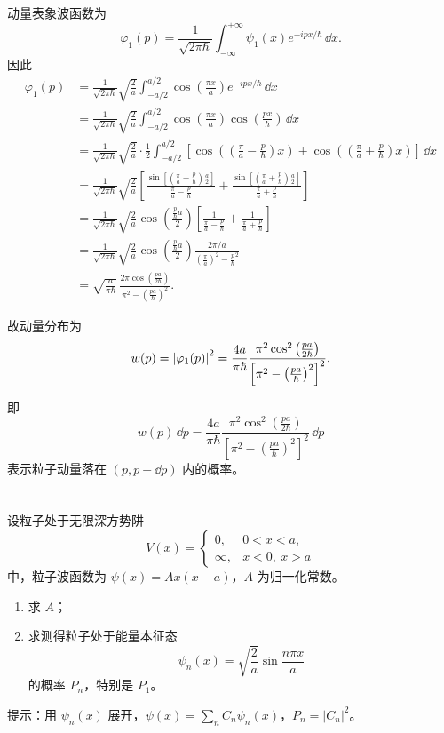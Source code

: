 \documentclass[10pt,a4paper]{article}
\begin{document}
动量表象波函数为
\[
\varphi_1(p)=\frac{1}{\sqrt{2\pi\hbar}}\int_{-\infty}^{+\infty}\psi_1(x)e^{-ipx/\hbar}\, \dd x.
\]
因此
\begin{align*}
  \varphi_1(p)&=\frac{1}{\sqrt{2\pi\hbar}}\sqrt{\frac{2}{a}}\int_{-a/2}^{a/2}\cos\left(\frac{\pi x}{a}\right)e^{-ipx/\hbar}\, \dd x\\
  &=\frac{1}{\sqrt{2\pi\hbar}}\sqrt{\frac{2}{a}}\int_{-a/2}^{a/2}\cos\left(\frac{\pi x}{a}\right)\cos\left(\frac{px}{\hbar}\right)\, \dd x\\
  &=\frac{1}{\sqrt{2\pi\hbar}}\sqrt{\frac{2}{a}}\cdot\frac{1}{2}
  \int_{-a/2}^{a/2}
  \left[
  \cos\left(\left(\frac{\pi}{a}-\frac{p}{\hbar}\right)x\right)
  +\cos\left(\left(\frac{\pi}{a}+\frac{p}{\hbar}\right)x\right)
  \right]\, \dd x \\
  &=\frac{1}{\sqrt{2\pi\hbar}}\sqrt{\frac{2}{a}}
  \left[
  \frac{\sin\left[\left(\frac{\pi}{a}-\frac{p}{\hbar}\right)\frac{a}{2}\right]}{\frac{\pi}{a}-\frac{p}{\hbar}}
  +
  \frac{\sin\left[\left(\frac{\pi}{a}+\frac{p}{\hbar}\right)\frac{a}{2}\right]}{\frac{\pi}{a}+\frac{p}{\hbar}}
  \right] \\
  &=\frac{1}{\sqrt{2\pi\hbar}}\sqrt{\frac{2}{a}}
  \cos\left(\frac{\frac{p}{\hbar}a}{2}\right)
  \left[
  \frac{1}{\frac{\pi}{a}-\frac{p}{\hbar}}
  +
  \frac{1}{\frac{\pi}{a}+\frac{p}{\hbar}}
  \right] \\
  &=\frac{1}{\sqrt{2\pi\hbar}}\sqrt{\frac{2}{a}}
  \cos\left(\frac{\frac{p}{\hbar}a}{2}\right)
  \frac{2\pi/a}{\left(\frac{\pi}{a}\right)^2-\frac{p}{\hbar}^2} \\
  &=\sqrt{\frac{a}{\pi\hbar}}\,
  \frac{2\pi\cos\left(\frac{pa}{2\hbar}\right)}{\pi^2-\left(\frac{pa}{\hbar}\right)^2}.
\end{align*}

故动量分布为
\[
w(p)=\abs{\varphi_1(p)}^2
=\frac{4a}{\pi\hbar}
\frac{\pi^2\cos^2\left(\frac{pa}{2\hbar}\right)}
{\left[\pi^2-\left(\frac{pa}{\hbar}\right)^2\right]^2}.
\]

即
\[
w(p)\, \dd p
=
\frac{4a}{\pi\hbar}
\frac{\pi^2\cos^2\left(\frac{pa}{2\hbar}\right)}
{\left[\pi^2-\left(\frac{pa}{\hbar}\right)^2\right]^2}
\, \dd p
\]
表示粒子动量落在 \((p,p+\dd p)\) 内的概率。

\section{}
设粒子处于无限深方势阱
\[
V(x)=
\begin{cases}
0, & 0<x<a,\\
\infty, & x<0,\ x>a
\end{cases}
\]
中，粒子波函数为 $\psi(x)=Ax(x-a)$，$A$ 为归一化常数。
\begin{enumerate}[label=(\alph*)]
  \item 求 $A$；
  \item 求测得粒子处于能量本征态
  \[
  \psi_n(x)=\sqrt{\frac{2}{a}}\sin\frac{n\pi x}{a}
  \]
  的概率 $P_n$，特别是 $P_1$。
\end{enumerate}
提示：用 $\psi_n(x)$ 展开，$\psi(x)=\sum_n C_n\psi_n(x)$，$P_n=|C_n|^2$。
\end{document}
